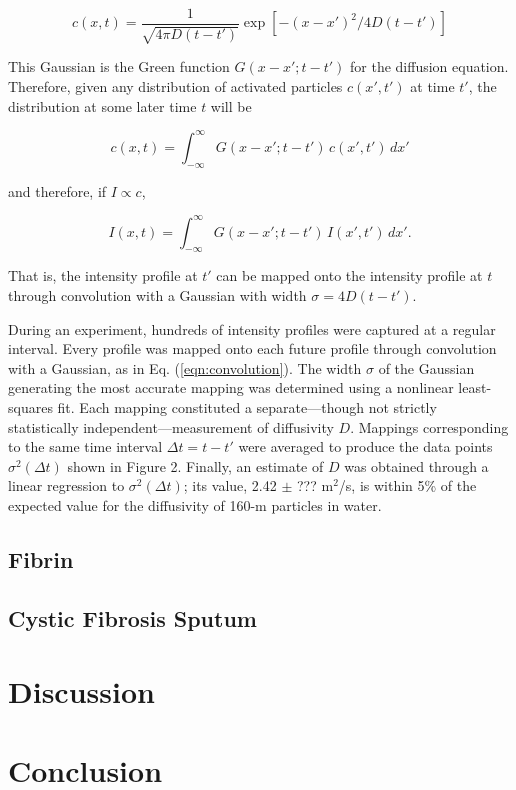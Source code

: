 \begin{equation}
 c(x, t) = \frac{1}{\sqrt{4\pi D (t-t')}}\exp\left[-(x-x')^2/4D(t - t')\right]
\end{equation}

\noindent This Gaussian is the Green function $G(x - x'; t - t')$ for the diffusion equation. Therefore, given any distribution of activated particles $c(x', t')$ at time $t'$, the distribution at some later time $t$ will be

\begin{equation}
 \label{eqn:convolution}
 c(x, t) = \int_{-\infty}^\infty G(x - x'; t - t')\, c(x', t')\,dx'
\end{equation}

\noindent and therefore, if $I \propto c$,

\begin{equation}
 \label{eqn:convolution}
 I(x, t) = \int_{-\infty}^\infty G(x - x'; t - t')\, I(x', t')\,dx'.
\end{equation}

\noindent That is, the intensity profile at $t'$ can be mapped onto the intensity profile at $t$ through convolution with a Gaussian with width $\sigma=4D(t-t')$.

During an experiment, hundreds of intensity profiles were captured at a regular interval. Every profile was mapped onto each future profile through convolution with a Gaussian, as in Eq. (\ref{eqn:convolution}). The width $\sigma$ of the Gaussian generating the most accurate mapping was determined using a nonlinear least-squares fit. Each mapping constituted a separate---though not strictly statistically independent---measurement of diffusivity $D$. Mappings corresponding to the same time interval $\Delta t = t - t'$ were averaged to produce the data points $\sigma^2(\Delta t)$ shown in Figure 2. Finally, an estimate of $D$ was obtained through a linear regression to $\sigma^2(\Delta t)$; its value, 2.42 $\pm$ ??? \textmu m$^2$/s, is within 5\% of the expected value for the diffusivity of 160-\textmu m particles in water.

\subsection{Fibrin}
\subsection{Cystic Fibrosis Sputum}

\section{Discussion}
\section{Conclusion}